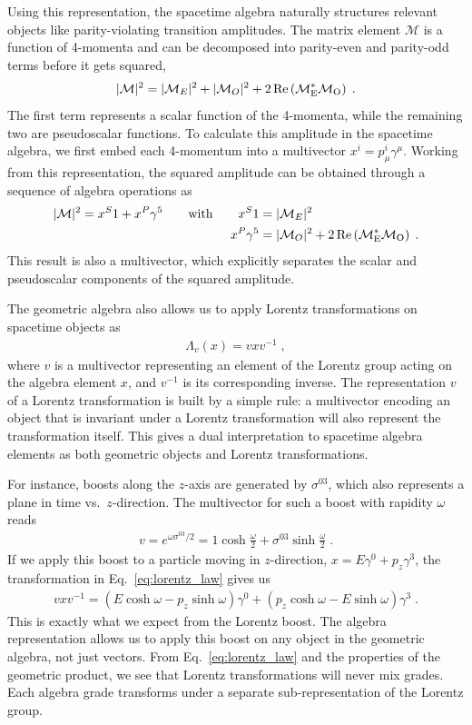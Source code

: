 \documentclass[submission, Phys]{SciPost}
\begin{document}
Using this representation, the spacetime algebra naturally structures relevant objects like parity-violating transition amplitudes. The matrix element $\mathcal{M}$ is a function of 4-momenta and can be decomposed into parity-even and parity-odd terms before it gets squared,
%
\begin{align}
    |\mathcal{M}|^2 = |\mathcal{M}_E|^2 + |\mathcal{M}_O|^2 + 2\, \rm{Re}\left(\mathcal{M}_E^* \mathcal{M}_O \right) \; .
\end{align}
%
The first term represents a scalar function of the 4-momenta, while the remaining two are pseudoscalar functions. To calculate this amplitude in the spacetime algebra, we first embed each 4-momentum into a multivector $x^i = p_\mu^i \gamma^\mu$. Working from this representation, the squared amplitude can be obtained through a sequence of algebra operations as
%
\begin{align}
    |\mathcal{M}|^2 = x^S1 + x^P \gamma^5
    \qquad \text{with} \qquad
    x^S1 &= |\mathcal{M}_E|^2 \notag \\
    x^P \gamma^5 &= |\mathcal{M}_O|^2 + 2\, \rm{Re}\left(\mathcal{M}_E^* \mathcal{M}_O \right) \; .
\end{align}
%
This result is also a multivector, which explicitly separates the scalar and pseudoscalar components of the squared amplitude.

The geometric algebra also allows us to apply Lorentz transformations on spacetime objects as 
%
\begin{align}
    \Lambda_v(x) = vxv^{-1} \; , 
    \label{eq:lorentz_law}
\end{align}
%
where $v$ is a multivector representing an element of the Lorentz group acting on the algebra element $x$, and $v^{-1}$ is its corresponding inverse. The representation $v$ of a Lorentz transformation is built by a simple rule: a multivector encoding an object that is invariant under a Lorentz transformation will also represent the transformation itself. This gives a dual interpretation to spacetime algebra elements as both geometric objects and Lorentz transformations.

For instance, boosts along the $z$-axis are generated by $\sigma^{03}$, which also represents a plane in time vs.\ $z$-direction. The multivector for such a boost with rapidity $\omega$ reads
%
\begin{align}
    v = e^{\omega \sigma^{03}/2} = 1\cosh \frac{\omega}{2} + \sigma^{03}\sinh \frac{\omega}{2}  \; .
\end{align}
%
If we apply this boost to a particle moving in $z$-direction, $x=E\gamma^0+p_z\gamma^3$, the transformation in Eq.~\eqref{eq:lorentz_law} gives us 
%
\begin{align}
    vxv^{-1} = (E\cosh \omega - p_z\sinh \omega)\gamma^0 + (p_z\cosh \omega - E\sinh \omega)\gamma^3 \; .
\end{align}
%
This is exactly what we expect from the Lorentz boost. The algebra representation allows us to apply this boost on any object in the geometric algebra, not just vectors. From Eq.~\eqref{eq:lorentz_law} and the properties of the geometric product, we see that Lorentz transformations will never mix grades. Each algebra grade transforms under a separate sub-representation of the Lorentz group.
\end{document}
